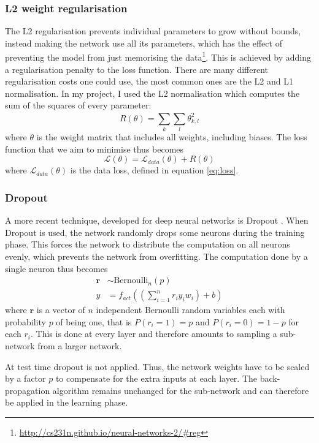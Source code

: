 \documentclass[12pt,a4paper,twoside,openright]{report}
\begin{document}
\subsubsection{\textbf{L2} weight regularisation}
The L2 regularisation prevents individual parameters to grow without bounds, instead making the network use all its parameters, which has the effect of preventing the model from just memorising the data\footnote{\url{http://cs231n.github.io/neural-networks-2/\#reg}}. This is achieved by adding a regularisation penalty to the loss function. There are many different regularisation costs one could use, the most common ones are the L2 and L1 normalisation. In my project, I used the L2 normalisation which computes the sum of the squares of every parameter:
\begin{equation}
	R(\theta) = \sum_{k}^{} \sum_{l}^{} \theta_{k,l}^2
\end{equation} 
where $\theta$ is the weight matrix that includes all weights, including biases.
The loss function that we aim to minimise thus becomes
\begin{equation}
	\mathcal{L}(\theta) = \mathcal{L}_{data}(\theta) + R(\theta) 
\end{equation}
where $\mathcal{L}_{data}(\theta)$ is the data loss, defined in equation \ref{eq:loss}. 

\subsubsection{Dropout}
A more recent technique, developed for deep neural networks is Dropout \cite{dropout}. When Dropout is used, the network randomly drops some neurons during the training phase. This forces the network to distribute the computation on all neurons evenly, which prevents the network from overfitting. The computation done by a single neuron thus becomes
\begin{equation}
\begin{split}
	\textbf{r} & \sim \text{Bernoulli}_n(p) \\
	y & = f_{act}((\sum_{i=1}^{n} r_i y_i w_i) + b)
\end{split}
\end{equation}
where $\textbf{r}$ is a vector of $n$ independent Bernoulli random variables each with probability $p$ of being one, that is $P(r_i = 1) = p$ and $P(r_i = 0) = 1 - p$ for each $r_i$. This is done at every layer and therefore amounts to sampling a sub-network from a larger network. 

At test time dropout is not applied. Thus, the network weights have to be scaled by a factor $p$ to compensate for the extra inputs at each layer. The back-propagation algorithm remains unchanged for the sub-network and can therefore be applied in the learning phase.
\end{document}
